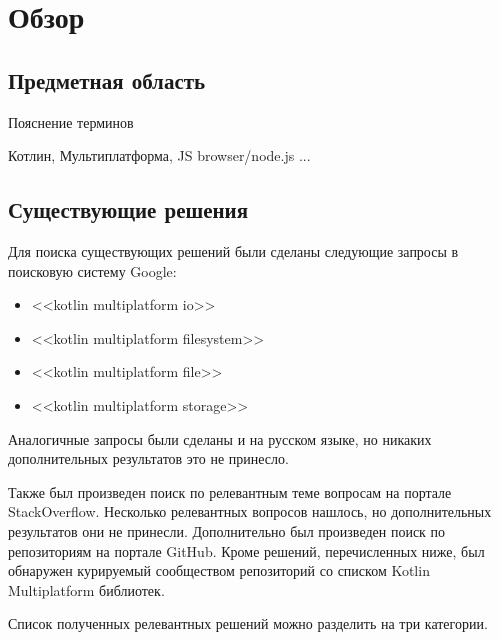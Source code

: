 \section{Обзор}

\subsection{Предметная область}
    Пояснение терминов

    Котлин, Мультиплатформа, JS browser/node.js ...

\subsection{Существующие решения}
    Для поиска существующих решений были сделаны следующие запросы в поисковую систему Google:
    \begin{itemize}
        \item <<kotlin multiplatform io>>
        \item <<kotlin multiplatform filesystem>>
        \item <<kotlin multiplatform file>>
        \item <<kotlin multiplatform storage>>
    \end{itemize}
    Аналогичные запросы были сделаны и на русском языке, но никаких дополнительных результатов это не принесло.

    Также был произведен поиск по релевантным теме вопросам на портале StackOverflow\cite{stackoverflow}. Несколько релевантных вопросов нашлось\cite{so-file-io-with-kotlin-multiplatform,so-read-write-file-in-kotlin-native-ios-side}, но дополнительных результатов они не принесли.
    Дополнительно был произведен поиск по репозиториям на портале GitHub\cite{github}. Кроме решений, перечисленных ниже, был обнаружен курируемый сообществом репозиторий со списком Kotlin Multiplatform библиотек\cite{gh-kotlin-multiplatform-libs}.

    Список полученных релевантных решений можно разделить на три категории.

    \newcommand{\existingsolution}[3]{\item \textbf{#1}#2\par#3}

